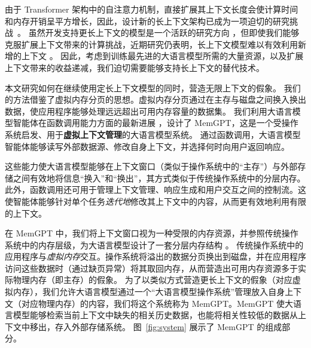 \documentclass[UTF8,fontset=fandol,a4paper,11pt]{ctexart}
\newcommand{\ours}{MemGPT\xspace}
\begin{document}
由于 Transformer 架构中的自注意力机制，直接扩展其上下文长度会使计算时间和内存开销呈平方增长，因此，设计新的长上下文架构已成为一项迫切的研究挑战~\citep{dai2019transformerxl,kitaev2020reformer,beltagy2020longformer}。
虽然开发支持更长上下文的模型是一个活跃的研究方向 \citep{dong2023longcontextsurvey}，但即使我们能够克服扩展上下文带来的计算挑战，近期研究仍表明，长上下文模型难以有效利用新增的上下文 \citep{liu2023lostinmiddle}。
因此，考虑到训练最先进的大语言模型所需的大量资源，以及扩展上下文带来的收益递减，我们迫切需要能够支持长上下文的替代技术。

本文研究如何在继续使用定长上下文模型的同时，营造无限上下文的假象。
我们的方法借鉴了虚拟内存分页的思想。虚拟内存分页通过在主存与磁盘之间换入换出数据，使应用程序能够处理远远超出可用内存容量的数据集。
我们利用大语言模型智能体在函数调用能力方面的最新进展 \citep{schick2023toolformer,liu2023agentbench}，设计了 \ours，这是一个受操作系统启发、用于\textbf{虚拟上下文管理}的大语言模型系统。
通过函数调用，大语言模型智能体能够读写外部数据源、修改自身上下文，并选择何时向用户返回响应。

这些能力使大语言模型能够在上下文窗口（类似于操作系统中的“主存”）与外部存储之间有效地将信息“换入”和“换出”，其方式类似于传统操作系统中的分层内存。
此外，函数调用还可用于管理上下文管理、响应生成和用户交互之间的控制流。这使智能体能够针对单个任务\textit{迭代地}修改其上下文中的内容，从而更有效地利用有限的上下文。

在 \ours 中，我们将上下文窗口视为一种受限的内存资源，并参照传统操作系统中的内存层级，为大语言模型设计了一套分层内存结构 \citep{patterson1988caseforraid}。
传统操作系统中的应用程序与\textit{虚拟内存}交互。操作系统将溢出的数据分页换出到磁盘，并在应用程序访问这些数据时（通过缺页异常）将其取回内存，从而营造出可用内存资源多于实际物理内存（即主存）的假象。
为了以类似方式营造更长上下文的假象（对应虚拟内存），我们允许大语言模型通过一个“大语言模型操作系统”管理放入自身上下文（对应物理内存）的内容，我们将这个系统称为 \ours。\ours 使大语言模型能够检索当前上下文中缺失的相关历史数据，也能将相关性较低的数据从上下文中移出，存入外部存储系统。
图~\ref{fig:system} 展示了 \ours 的组成部分。
\end{document}
